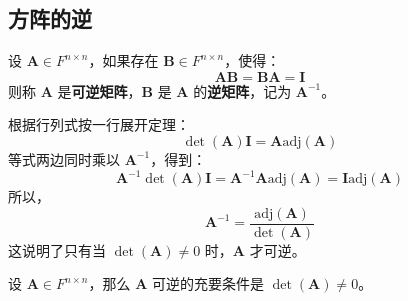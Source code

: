     


\vspace{1em}
\subsection{方阵的逆}

\begin{definition}
    设 $\mathbf{A} \in F^{n \times n}$，如果存在 $\mathbf{B} \in F^{n \times n}$，使得：
    \[
        \mathbf{A}\mathbf{B} = \mathbf{B}\mathbf{A} = \mathbf{I}
    \]
    则称 $\mathbf{A}$ 是\textbf{可逆矩阵}，$\mathbf{B}$ 是 $\mathbf{A}$ 的\textbf{逆矩阵}，记为 $\mathbf{A}^{-1}$。
\end{definition}

\begin{note}
    根据行列式按一行展开定理：
    \[
        \det(\mathbf{A}) \mathbf{I} = \mathbf{A}\mathrm{adj}(\mathbf{A})
    \]
    等式两边同时乘以 $\mathbf{A}^{-1}$，得到：
    \[
        \mathbf{A}^{-1}\det(\mathbf{A}) \mathbf{I} = \mathbf{A}^{-1}\mathbf{A}\mathrm{adj}(\mathbf{A}) = \mathbf{I}\mathrm{adj}(\mathbf{A})
    \]
    所以，
    \[
        \mathbf{A}^{-1} = \frac{\mathrm{adj}(\mathbf{A})}{\det(\mathbf{A})}
    \]
    这说明了只有当 $\det(\mathbf{A}) \neq 0$ 时，$\mathbf{A}$ 才可逆。
\end{note}

\begin{proposition}[矩阵可逆的充要条件]
    设 $\mathbf{A} \in F^{n \times n}$，那么 $\mathbf{A}$ 可逆的充要条件是 $\det(\mathbf{A}) \neq 0$。
    \label{prop:matrix_invertible_iff_det_nonzero}
\end{proposition}



